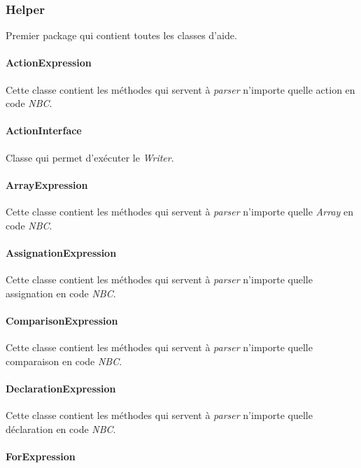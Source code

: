 \subsubsection{Helper}

Premier package qui contient toutes les classes d'aide.

\paragraph{ActionExpression}

Cette classe contient les méthodes qui servent à \emph{parser} n'importe quelle action en code \emph{NBC}.

\paragraph{ActionInterface}

Classe qui permet d'exécuter le \emph{Writer}.

\paragraph{ArrayExpression}

Cette classe contient les méthodes qui servent à \emph{parser} n'importe quelle \emph{Array} en code \emph{NBC}.

\paragraph{AssignationExpression}

Cette classe contient les méthodes qui servent à \emph{parser} n'importe quelle assignation en code \emph{NBC}.

\paragraph{ComparisonExpression}

Cette classe contient les méthodes qui servent à \emph{parser} n'importe quelle comparaison en code \emph{NBC}.

\paragraph{DeclarationExpression}

Cette classe contient les méthodes qui servent à \emph{parser} n'importe quelle déclaration en code \emph{NBC}.

\paragraph{ForExpression}

